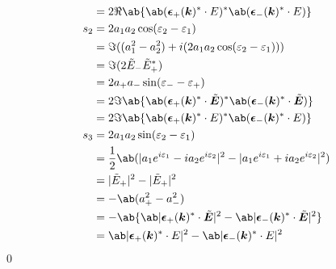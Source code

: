 \documentclass[uplatex,dvipdfmx,a4paper,11pt]{jlreq}
\makeatletter
\newcommand{\kk}{\bm{k}}
\newcommand{\ET}{\tilde{\bm{E}}}
\newcommand{\EC}{\mathcal\bm{E}}
\newcommand{\ee}{\bm{\epsilon}}
\theoremstyle{definition}
\renewenvironment{proof}[1][\proofname]{\par
  \normalfont
  \topsep6\p@\@plus6\p@ \trivlist
  \item[\hskip\labelsep{\bfseries #1}\@addpunct{\bfseries}]\ignorespaces\quad\par
}{%
  \qed\endtrivlist\@endpefalse
}
\renewcommand\proofname{証明}
\makeatother
\begin{document}
\begin{proof}
\begin{align}
        & = 2\Re\ab\{\ab(\ee_+(\kk)^*\cdot\EC)^*\ab(\ee_-(\kk)^*\cdot\EC)\}                                                           \\
    s_2 & = 2a_1a_2\cos(\varepsilon_2 - \varepsilon_1)                                                                                \\
        & = \Im((a_1^2 - a_2^2) + i(2a_1a_2\cos(\varepsilon_2 - \varepsilon_1)))                                                      \\
        & = \Im(2\tilde{E}_-\tilde{E}_+^*)                                                                                            \\
        & = 2a_+a_-\sin(\varepsilon_- - \varepsilon_+)                                                                                \\
        & = 2\Im\ab\{\ab(\ee_+(\kk)^*\cdot\ET)^*\ab(\ee_-(\kk)^*\cdot\ET)\}                                                           \\
        & = 2\Im\ab\{\ab(\ee_+(\kk)^*\cdot\EC)^*\ab(\ee_-(\kk)^*\cdot\EC)\}                                                           \\
    s_3 & = 2a_1a_2\sin(\varepsilon_2 - \varepsilon_1)                                                                                \\
        & = \frac{1}{2}\ab(|a_1e^{i\varepsilon_1} - i a_2e^{i\varepsilon_2}|^2 - |a_1e^{i\varepsilon_1} + i a_2e^{i\varepsilon_2}|^2) \\
        & = |\tilde{E}_+|^2 - |\tilde{E}_+|^2                                                                                         \\
        & = -\ab(a_+^2 - a_-^2)                                                                                                       \\
        & = -\ab\{\ab|\ee_+(\kk)^*\cdot\ET|^2 - \ab|\ee_-(\kk)^*\cdot\ET|^2\}                                                         \\
        & = \ab|\ee_+(\kk)^*\cdot\EC|^2 - \ab|\ee_-(\kk)^*\cdot\EC|^2
  \end{align}
\end{proof}
\end{document}

